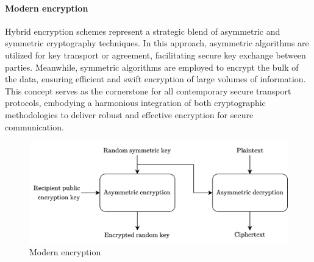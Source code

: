 \paragraph*{Modern encryption}
Hybrid encryption schemes represent a strategic blend of asymmetric and symmetric cryptography techniques.
In this approach, asymmetric algorithms are utilized for key transport or agreement, facilitating secure key exchange between parties. Meanwhile, symmetric algorithms are employed to encrypt the bulk of the data, ensuring efficient and swift encryption of large volumes of information. 
This concept serves as the cornerstone for all contemporary secure transport protocols, embodying a harmonious integration of both cryptographic methodologies to deliver robust and effective encryption for secure communication.
\begin{figure}[H]
    \centering
    \includegraphics[width=0.75\linewidth]{images/menc.png}
    \caption{Modern encryption}
\end{figure}

